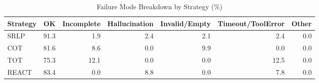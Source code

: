 \begin{table}[htbp]
\centering
\caption{Failure Mode Breakdown by Strategy (\%)}
\label{tab:error_breakdown}
\begin{tabular}{lrrrrrr}
\toprule
Strategy & OK & Incomplete & Hallucination & Invalid/Empty & Timeout/ToolError & Other \\
\midrule
SRLP & 91.3 & 1.9 & 2.4 & 2.1 & 2.4 & 0.0 \\
COT & 81.6 & 8.6 & 0.0 & 9.9 & 0.0 & 0.0 \\
TOT & 75.3 & 12.1 & 0.0 & 0.0 & 12.5 & 0.0 \\
REACT & 83.4 & 0.0 & 8.8 & 0.0 & 7.8 & 0.0 \\
\bottomrule
\end{tabular}
\end{table}